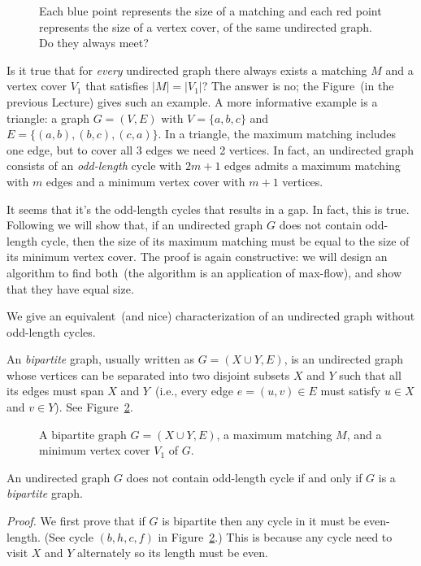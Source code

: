 \begin{figure}[h]
\centering{}
\caption{Each blue point represents the size of a matching and each red point represents the size of a vertex cover,
of the same undirected graph. Do they always meet?}
\label{fig:meet}
\end{figure}

Is it true that for \emph{every} undirected graph there always exists a matching $M$ and a 
vertex cover $V_1$ that satisfies $|M| = |V_1|$?
The answer is no; the Figure~(in the previous Lecture) gives such an example.
A more informative example is a triangle: a graph $G = (V, E)$ with $V = \{a,b,c\}$ and $E = \{(a,b), (b,c), (c,a)\}$.
In a triangle, the maximum matching includes one edge, but to cover all 3 edges we need 2 vertices.
In fact, an undirected graph consists of an \emph{odd-length} cycle with $2m+1$ edges admits
a maximum matching with $m$ edges and a minimum vertex cover with $m+1$ vertices.

It seems that it's the odd-length cycles that results in a gap.
In fact, this is true. Following we will show that, if an undirected
graph $G$ does not contain odd-length cycle, then the size of its maximum matching
must be equal to the size of its minimum vertex cover. The proof is again constructive:
we will design an algorithm to find both~(the algorithm is an application of max-flow), and show that they have equal size.

We give an equivalent~(and nice) characterization of an undirected graph without odd-length cycles.

An \emph{bipartite} graph, usually written as $G = (X\cup Y, E)$, is an undirected graph
whose vertices can be separated into two disjoint subsets $X$ and $Y$ such that all its edges
must span $X$ and $Y$~(i.e., every edge $e = (u,v)\in E$ must satisfy $u\in X$ and $v\in Y$).
See Figure~\ref{fig:bipartite}.

\begin{figure}[h]
\centering{}
\caption{A bipartite graph $G = (X\cup Y, E)$, 
a maximum matching $M$, and a minimum vertex cover $V_1$ of $G$.  }
\label{fig:bipartite}
\end{figure}


\begin{fact}
An undirected graph $G$ does not contain odd-length cycle if and only if $G$ is a \emph{bipartite} graph.
\end{fact}


\emph{Proof.} We first prove that if $G$ is bipartite then
any cycle in it must be even-length. (See cycle $(b,h,c,f)$ in Figure~\ref{fig:bipartite}.)
This is because any cycle need to visit $X$ and $Y$ alternately so its length must be even.


